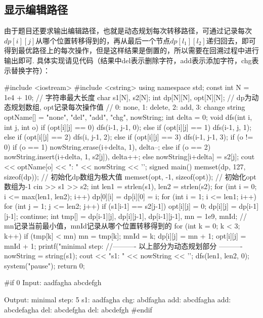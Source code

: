 \documentclass[12pt, a4paper, oneside]{ctexart}
\numberwithin{equation}{section}  %
\begin{document}
\subsection{显示编辑路径}
    由于题目还要求输出编辑路径，也就是动态规划每次转移路径，可通过记录每次$dp[i][j]$从哪个位置转移得到的，再从最后一个节点$dp[l_1][l_2]$递归回去，即可得到最优路径上的每次操作，但是这样结果是倒置的，所以需要在回溯过程中进行输出即可. 具体实现请见代码（结果中del表示删除字符，add表示添加字符，chg表示替换字符）：

    \begin{cppcode}
#include <iostream>
#include <cstring>
using namespace std;
const int N = 1e4 + 10;  // 字符串最大长度
char s1[N], s2[N];
int dp[N][N], opt[N][N];  // dp为动态规划数组, opt记录每次操作值
// 0: none, 1: delete, 2: add, 3: change
string optName[] = {"none", "del", "add", "chg"}, nowString;
int delta = 0;
void dfs(int i, int j, int o) {
    if (opt[i][j] == 0) dfs(i-1, j-1, 0);
    else if (opt[i][j] == 1) dfs(i-1, j, 1);
    else if (opt[i][j] == 2) dfs(i, j-1, 2);
    else if (opt[i][j] == 3) dfs(i-1, j-1, 3);
    if (o != 0) {
        if (o == 1) nowString.erase(i+delta, 1), delta--;
        else if (o == 2) nowString.insert(i+delta, 1, s2[j]), delta++;
        else nowString[i+delta] = s2[j];
        cout << optName[o] << ": " << nowString << '\n';
    }
}
signed main() {
    memset(dp, 127, sizeof(dp));  // 初始化dp数组为极大值
    memset(opt, -1, sizeof(opt));  // 初始化opt数组为-1
    cin >> s1 >> s2;
    int len1 = strlen(s1), len2 = strlen(s2);
    for (int i = 0; i <= max(len1, len2); i++) dp[0][i] = dp[i][0] = i;
    for (int i = 1; i <= len1; i++) {
        for (int j = 1; j <= len2; j++) {
            if (s1[i-1] == s2[j-1]) {
                opt[i][j] = 0;
                dp[i][j] = dp[i-1][j-1];
                continue;
            }
            int tmp[] = {dp[i-1][j], dp[i][j-1], dp[i-1][j-1]}, mn = 1e9, mnId;  // mn记录当前最小值，mnId记录从哪个位置转移得到的
            for (int k = 0; k < 3; k++) {
                if (tmp[k] < mn) {
                    mn = tmp[k];
                    mnId = k;
                }
            }
            dp[i][j] = mn + 1;
            opt[i][j] = mnId + 1;
        }
    }
    printf("minimal step: %
    //---------- 以上部分为动态规划部分 ----------
    nowString = string(s1);
    cout << "s1:  " << nowString << '\n';
    dfs(len1, len2, 0);
    system("pause");
    return 0;
}

#if 0
Input:
aadfagha
abcdefgh

Output:
minimal step: 5
s1:  aadfagha
chg: abdfagha
add: abcdfagha
add: abcdefagha
del: abcdefgha
del: abcdefgh
#endif
    \end{cppcode}
\end{document}
